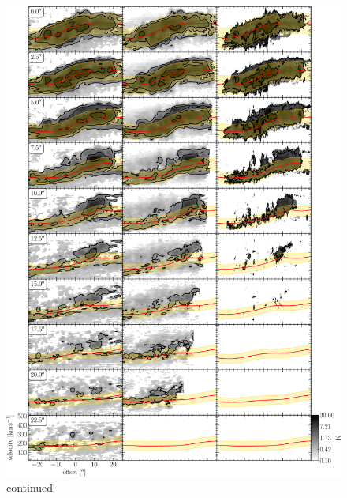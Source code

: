\begin{figure}
	\ContinuedFloat
	\centering
	\includegraphics[width=\textwidth]{images/chapters/papers/outflow/outflow_figC1b.pdf}
	\caption[]{continued}
\end{figure}


